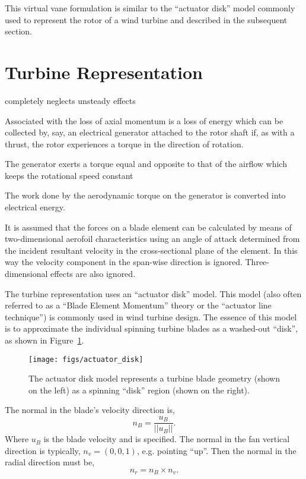 This virtual vane formulation is similar to the ``actuator disk'' model
commonly used to represent the rotor of a wind turbine and
described in the subsequent section. 

\section{Turbine Representation}
\label{sec:actuator_disk}
%
%


completely neglects unsteady effects

Associated with the loss of axial momentum is a loss of energy which can
be collected by, say, an electrical generator attached to the rotor
shaft if, as with a thrust, the rotor experiences a torque in the
direction of rotation. 

The generator exerts a torque equal and opposite to that of the airflow
which keeps the rotational speed constant

 The work done by the aerodynamic torque on the
generator is converted into electrical energy.

It is assumed that the forces on a blade element can be calculated by
means of two-dimensional aerofoil characteristics using an angle of
attack determined from the incident resultant velocity in the
cross-sectional plane of the element. In this way the velocity component
in the span-wise direction is ignored. Three-dimensional effects are
also ignored\cite{burton2001wind}. 

The turbine representation uses an ``actuator disk'' model. This model
(also often referred to as a ``Blade Element Momentum'' theory or the
``actuator line technique'') is commonly used in wind turbine
design\cite{shevell1983fundamentals,betz,leclerc}. The essence of this
model is to approximate the individual spinning turbine blades as a
washed-out ``disk'', as shown in Figure~\ref{fig:actuator_disk}.  

   \begin{figure}[!htb]
    \centering
    \texttt{[image: figs/actuator\_disk]}
     \caption{The actuator disk model represents a turbine blade
    geometry (shown on the left) as a spinning ``disk'' region (shown
    on the right).}
     \label{fig:actuator_disk}
   \end{figure}

The normal in the blade's velocity direction is,
\begin{equation*}
n_B = \frac{u_B}{||u_B||}. 
\end{equation*}
Where $u_B$ is the blade velocity and is specified. The normal in the
fan vertical direction is typically, $n_v = \left(0,0,1\right)$, 
e.g. pointing ``up''. Then the normal in the radial direction must be, 
\begin{equation*}
n_r = n_B \times n_v. 
\end{equation*}

